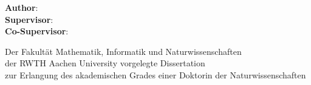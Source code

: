 \makeatletter
\begin{titlepage}
    \begin{center}
        \vspace*{1cm}

        \Large
        \textbf{\@title}

        \vspace{1.5cm}
        
        \thesistype{}
        
        \vspace{1cm}


        \vspace{1cm}

        \large
        \textbf{Author}: \thesisauthor{}\\
        \large
        \textbf{Supervisor}: \supervisor{}\\
        \large
        \textbf{Co-Supervisor}: \cosupervisor{}

        \vspace{1cm}
        \large
        Der Fakultät Mathematik, Informatik und Naturwissenschaften\\
        der RWTH Aachen University vorgelegte Dissertation\\
        zur Erlangung des akademischen Grades einer Doktorin der Naturwissenschaften

        \vspace{1cm}
        \@date

    \end{center}
\end{titlepage}
\makeatother
